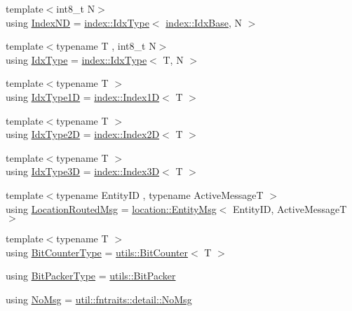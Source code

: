 \begin{DoxyCompactItemize}
\item 
{\footnotesize template$<$int8\+\_\+t N$>$ }\\using \hyperlink{namespacevt_a03846344a8d106928ae0dfbb2360ec30}{Index\+ND} = \hyperlink{namespacevt_1_1index_a939bace7aba6cd4a76b2c12a138c5991}{index\+::\+Idx\+Type}$<$ \hyperlink{namespacevt_1_1index_a0dbb8d47463da27c1436e8e4ddb02743}{index\+::\+Idx\+Base}, N $>$
\item 
{\footnotesize template$<$typename T , int8\+\_\+t N$>$ }\\using \hyperlink{namespacevt_a906c25b521ff516f5e8ba6d96fe2d424}{Idx\+Type} = \hyperlink{namespacevt_1_1index_a939bace7aba6cd4a76b2c12a138c5991}{index\+::\+Idx\+Type}$<$ T, N $>$
\item 
{\footnotesize template$<$typename T $>$ }\\using \hyperlink{namespacevt_a36127c6500f2311908c959be653da40e}{Idx\+Type1D} = \hyperlink{namespacevt_1_1index_a091a4f5a7a2c993d9727eaa60cf67d81}{index\+::\+Index1D}$<$ T $>$
\item 
{\footnotesize template$<$typename T $>$ }\\using \hyperlink{namespacevt_ab0fbc5ddf69b5aa0ed6a8d1658b504eb}{Idx\+Type2D} = \hyperlink{namespacevt_1_1index_a8373801efc8343f24d6e8ba57df40a69}{index\+::\+Index2D}$<$ T $>$
\item 
{\footnotesize template$<$typename T $>$ }\\using \hyperlink{namespacevt_a65e4a83c0567ecb7a54b78e9b8e7d7ab}{Idx\+Type3D} = \hyperlink{namespacevt_1_1index_a2c09a09f7346d370a0bcbbfb0d4459cd}{index\+::\+Index3D}$<$ T $>$
\item 
{\footnotesize template$<$typename Entity\+ID , typename Active\+MessageT $>$ }\\using \hyperlink{namespacevt_a0cb65f2151629893480ef391def4e733}{Location\+Routed\+Msg} = \hyperlink{structvt_1_1location_1_1_entity_msg}{location\+::\+Entity\+Msg}$<$ Entity\+ID, Active\+MessageT $>$
\item 
{\footnotesize template$<$typename T $>$ }\\using \hyperlink{namespacevt_a34b3eb2eea8db3cf4ae27ced35b19b46}{Bit\+Counter\+Type} = \hyperlink{structvt_1_1utils_1_1_bit_counter}{utils\+::\+Bit\+Counter}$<$ T $>$
\item 
using \hyperlink{namespacevt_a80d5091925c65efd88ca7f49fe1d633b}{Bit\+Packer\+Type} = \hyperlink{structvt_1_1utils_1_1_bit_packer}{utils\+::\+Bit\+Packer}
\item 
using \hyperlink{namespacevt_af7c7e4af1ee59911bd84482b2332c736}{No\+Msg} = \hyperlink{structvt_1_1util_1_1fntraits_1_1detail_1_1_no_msg}{util\+::fntraits\+::detail\+::\+No\+Msg}

\end{DoxyCompactItemize}
